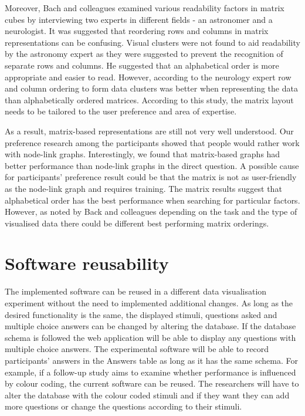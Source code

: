 \documentclass{l4proj}
\begin{document}
Moreover, Bach and colleagues \cite{bach2014visualizing} examined various readability factors in matrix cubes by interviewing two experts in different fields - an astronomer and a neurologist. It was suggested that reordering rows and columns in matrix representations can be confusing. Visual clusters were not found to aid readability by the astronomy expert as they were suggested to prevent the recognition of separate rows and columns. He suggested that an alphabetical order is more appropriate and easier to read. However, according to the neurology expert row and column ordering to form data clusters was better when representing the data than alphabetically ordered matrices. According to this study, the matrix layout needs to be tailored to the user preference and area of expertise.

As a result, matrix-based representations are still not very well understood. Our preference research among the participants showed that people would rather work with node-link graphs. Interestingly, we found that matrix-based graphs had better performance than node-link graphs in the direct question. A possible cause for participants' preference result could be that the matrix is not as user-friendly as the node-link graph and requires training. The matrix results suggest that alphabetical order has the best performance when searching for particular factors. However, as noted by Back and colleagues \cite{bach2014visualizing} depending on the task and the type of visualised data there could be different best performing matrix orderings. 

\section{Software reusability}

The implemented software can be reused in a different data visualisation experiment without the need to implemented additional changes. As long as the desired functionality is the same, the displayed stimuli, questions asked and multiple choice answers can be changed by altering the database. If the database schema is followed the web application will be able to display any questions with multiple choice answers. The experimental software will be able to record participants' answers in the Answers table as long as it has the same schema. For example, if a follow-up study aims to examine whether performance is influenced by colour coding, the current software can be reused. The researchers will have to alter the database with the colour coded stimuli and if they want they can add more questions or change the questions according to their stimuli. 
\end{document}
